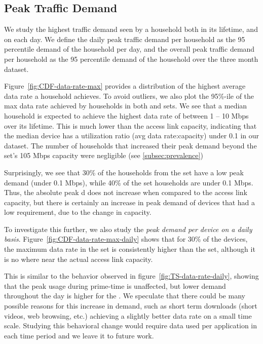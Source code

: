 \subsection{Peak Traffic Demand}\label{subsec:peakratio}

We study the highest traffic demand seen by a household both in its lifetime, 
and on each day. We define the daily peak traffic demand per household as the 
95 percentile demand of the household per day, and the overall peak traffic 
demand per household  as the 95 percentile demand of the household over the 
three month dataset.

Figure~\ref{fig:CDF-data-rate-max} provides a distribution of the highest 
average data rate a household achieves. To avoid outliers, we also plot the 
95\%-ile of the max data rate achieved by households in both \test and \control 
sets. We see that a median household is expected to achieve the highest data 
rate of between 1 -- 10 Mbps over its lifetime. This is much lower than the 
access link capacity, indicating that the median device has a utilization ratio 
(avg data rate:capacity) under 0.1 in our dataset. The number of households 
that increased their peak demand beyond the \control set's 105 Mbps 
capacity were negligible (see \autoref{subsec:prevalence})

Surprisingly, we see that 30\% of the households from the \test set have a low 
peak demand (under 0.1 Mbps), while 40\% of the \control set households 
are under 0.1 Mbps. Thus, the absolute peak d does not increase when 
compared to the access link capacity, but there is certainly an increase in 
peak demand of devices that  had a low requirement, due to the change in 
capacity.

To investigate this further, we also study the \emph{peak demand per device 
on a daily basis}. Figure~\ref{fig:CDF-data-rate-max-daily} shows that for 30\% 
of the devices, the maximum data rate in the \test set is consistently higher 
than the \control  set, although it is no where near the actual access link 
capacity.

This is similar to the behavior observed in figure~\ref{fig:TS-data-rate-daily}, 
showing that the peak usage during prime-time is unaffected, but lower 
demand throughout the day  is higher for the \test. We speculate that 
there could be many possible reasons for this increase in demand, such as 
short term downloads (short videos, web browsing, etc.) achieving a slightly 
 better data rate on a small time scale. Studying this behavioral change 
would require data used per application in each time period and we leave it to 
future work.


